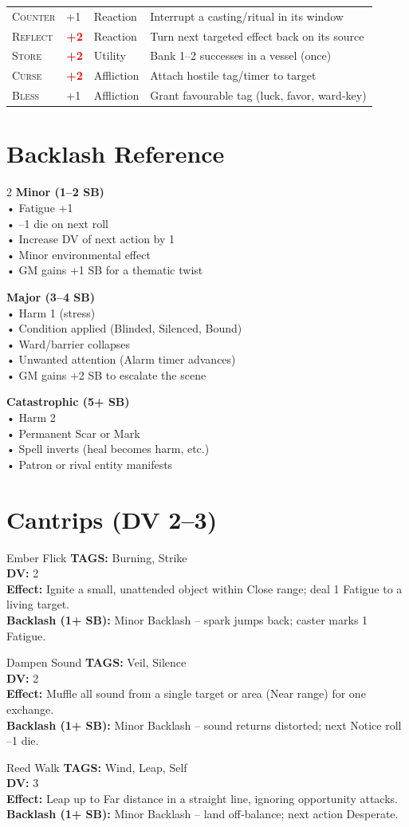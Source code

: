 \documentclass[10pt,a5paper]{book}
\newcommand{\dangerous}[1]{\textcolor{red}{\textbf{#1}}}
\newcommand{\tag}[1]{\textsc{#1}}
\newcommand{\spell}[5]{ %
    \begin{spellcard}{#1}
    \textbf{TAGS:} #2 \\
    \textbf{DV:} #3 \\
    \textbf{Effect:} #4 \\
    \textbf{Backlash (1+ SB):} #5
    \end{spellcard}
    \vspace{0.5cm}
}
\begin{document}
\begin{longtable}{@{} p{2.5cm} p{1.2cm} p{2.5cm} p{6cm} @{}}
\tag{Counter} & +1 & Reaction & Interrupt a casting/ritual in its window \\
\tag{Reflect} & \dangerous{+2} & Reaction & Turn next targeted effect back on its source \\
\tag{Store} & \dangerous{+2} & Utility & Bank 1--2 successes in a vessel (once) \\
\tag{Curse} & \dangerous{+2} & Affliction & Attach hostile tag/timer to target \\
\tag{Bless} & +1 & Affliction & Grant favourable tag (luck, favor, ward-key) \\
\bottomrule
\end{longtable}

\section{Backlash Reference}
\begin{tcolorbox}[colback=red!5, colframe=red!50]
\begin{multicols}{2}
\textbf{Minor (1--2 SB)} \\
• Fatigue +1 \\
• --1 die on next roll \\
• Increase DV of next action by 1 \\
• Minor environmental effect \\
• GM gains +1 SB for a thematic twist

\textbf{Major (3--4 SB)} \\
• Harm 1 (stress) \\
• Condition applied (Blinded, Silenced, Bound) \\
• Ward/barrier collapses \\
• Unwanted attention (Alarm timer advances) \\
• GM gains +2 SB to escalate the scene

\textbf{Catastrophic (5+ SB)} \\
• Harm 2 \\
• Permanent Scar or Mark \\
• Spell inverts (heal becomes harm, etc.) \\
• Patron or rival entity manifests
\end{multicols}
\end{tcolorbox}

\section{Cantrips (DV 2--3)}
\spell{Ember Flick}{Burning, Strike}{2}{Ignite a small, unattended object within Close range; deal 1 Fatigue to a living target.}{Minor Backlash -- spark jumps back; caster marks 1 Fatigue.}
\spell{Dampen Sound}{Veil, Silence}{2}{Muffle all sound from a single target or area (Near range) for one exchange.}{Minor Backlash -- sound returns distorted; next Notice roll --1 die.}
\spell{Reed Walk}{Wind, Leap, Self}{3}{Leap up to Far distance in a straight line, ignoring opportunity attacks.}{Minor Backlash -- land off‑balance; next action Desperate.}
\end{document}
